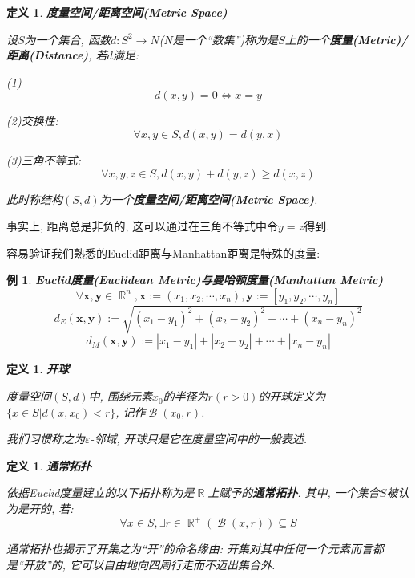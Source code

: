 \documentclass[UTF8]{ctexart}
\newcommand{\<}{\langle}
\renewcommand{\>}{\rangle}
\DeclareMathOperator{\B}{\mathcal{B}}
\DeclareMathOperator{\R}{\mathbb{R}}
\newtheorem{dfn}[thm]{定义}
\newtheorem{xmp}{例}[subsection]
\begin{document}
			\begin{dfn}
				\textbf{度量空间/距离空间(Metric Space)}

				设$S$为一个集合, 函数$d:S^2\to N$($N$是一个``数集'')称为是$S$上的一个\textbf{度量(Metric)/距离(Distance)}, 若$d$满足: 

				(1)\[d(x,y)=0\iff x=y\]

				(2)交换性: 
				\[\forall x,y\in S, d(x,y)=d(y,x)\]

				(3)三角不等式: 
				\[\forall x,y,z\in S, d(x,y)+d(y,z)\geq d(x,z)\]

				此时称结构$(S,d)$为一个\textbf{度量空间/距离空间(Metric Space)}. 
			\end{dfn}

            事实上, 距离总是非负的, 这可以通过在三角不等式中令$y=z$得到. 

            容易验证我们熟悉的Euclid距离与Manhattan距离是特殊的度量: 
            
            \begin{xmp}
                \textbf{Euclid度量(Euclidean Metric)与曼哈顿度量(Manhattan Metric)}
                \[\forall\bm x,\bm y\in \R^n, \bm x:=(x_1,x_2,\cdots,x_n), \bm y:=[y_1,y_2,\cdots,y_n]\]
                \[d_E(\bm x,\bm y):=\sqrt{{(x_1-y_1)}^2+{(x_2-y_2)}^2+\cdots+{(x_n-y_n)}^2}\]
                \[d_M(\bm x,\bm y):=|x_1-y_1|+|x_2-y_2|+\cdots+|x_n-y_n|\]
            \end{xmp}
            
            \begin{dfn}
                \textbf{开球}

                度量空间$(S,d)$中, 围绕元素$x_0$的半径为$r(r>0)$的开球定义为$\{x\in S|d(x,x_0)<r\}$, 记作$\B(x_0,r)$. 

                我们习惯称之为$\varepsilon$-邻域, 开球只是它在度量空间中的一般表述. 
            \end{dfn}
            
            \begin{dfn}
                \textbf{通常拓扑}

                依据Euclid度量建立的以下拓扑称为是$\R$上赋予的\textbf{通常拓扑}. 其中, 一个集合$S$被认为是开的, 若: 
                \[\forall x\in S, \exists r\in\R^+(\B(x,r))\subseteq S\]

                通常拓扑也揭示了开集之为``开''的命名缘由: 开集对其中任何一个元素而言都是``开放''的, 它可以自由地向四周行走而不迈出集合外. 
            \end{dfn}
            
\end{document}
